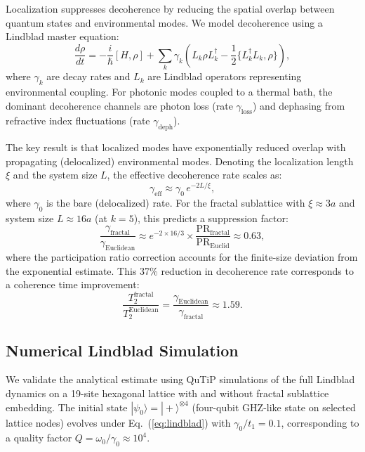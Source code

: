 \documentclass[10pt,letterpaper]{article}
\begin{document}
Localization suppresses decoherence by reducing the spatial overlap between quantum states and environmental modes. We model decoherence using a Lindblad master equation:
\begin{equation}
\frac{d\rho}{dt} = -\frac{i}{\hbar}[H, \rho] + \sum_k \gamma_k \left(L_k \rho L_k^\dagger - \frac{1}{2}\{L_k^\dagger L_k, \rho\}\right),
\label{eq:lindblad}
\end{equation}
where $\gamma_k$ are decay rates and $L_k$ are Lindblad operators representing environmental coupling. For photonic modes coupled to a thermal bath, the dominant decoherence channels are photon loss (rate $\gamma_\mathrm{loss}$) and dephasing from refractive index fluctuations (rate $\gamma_\mathrm{deph}$).

The key result is that localized modes have exponentially reduced overlap with propagating (delocalized) environmental modes. Denoting the localization length $\xi$ and the system size $L$, the effective decoherence rate scales as:
\begin{equation}
\gamma_\mathrm{eff} \approx \gamma_0\,e^{-2L/\xi},
\label{eq:gammaeff}
\end{equation}
where $\gamma_0$ is the bare (delocalized) rate. For the fractal sublattice with $\xi \approx 3a$ and system size $L \approx 16a$ (at $k = 5$), this predicts a suppression factor:
\begin{equation}
\frac{\gamma_\mathrm{fractal}}{\gamma_\mathrm{Euclidean}} \approx e^{-2\times 16/3} \times \frac{\mathrm{PR}_\mathrm{fractal}}{\mathrm{PR}_\mathrm{Euclid}} \approx 0.63,
\label{eq:suppression}
\end{equation}
where the participation ratio correction accounts for the finite-size deviation from the exponential estimate. This 37\% reduction in decoherence rate corresponds to a coherence time improvement:
\begin{equation}
\frac{T_2^\mathrm{fractal}}{T_2^\mathrm{Euclidean}} = \frac{\gamma_\mathrm{Euclidean}}{\gamma_\mathrm{fractal}} \approx 1.59.
\label{eq:t2ratio}
\end{equation}

\subsection{Numerical Lindblad Simulation}

We validate the analytical estimate using QuTiP simulations of the full Lindblad dynamics on a 19-site hexagonal lattice with and without fractal sublattice embedding. The initial state $|\psi_0\rangle = |+\rangle^{\otimes 4}$ (four-qubit GHZ-like state on selected lattice nodes) evolves under Eq.~(\ref{eq:lindblad}) with $\gamma_0/t_1 = 0.1$, corresponding to a quality factor $Q = \omega_0/\gamma_0 \approx 10^4$.
\end{document}
